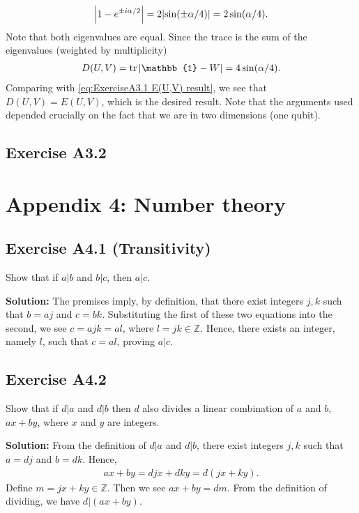 \documentclass{book}
\begin{document}
    \begin{align}
        \abs{1-e^{\pm i\alpha/2}} = 2\abs{\sin(\pm \alpha/4)} = 2 \sin (\alpha/4).
    \end{align}
    Note that both eigenvalues are equal. Since the trace is the sum of the eigenvalues (weighted by multiplicity)
    \begin{align}
        D(U,V) = \tr \abs{\mathbb{1}-W} = 4\sin(\alpha/4).
    \end{align}
    Comparing with \eqref{eq:ExerciseA3.1 E(U,V) result}, we see that $D(U,V) = E(U,V)$, which is the desired result. Note that the arguments used depended crucially on the fact that we are in two dimensions (one qubit).
    
\section*{Exercise A3.2}

\chapter*{Appendix 4: Number theory}


\section*{Exercise A4.1 (Transitivity)}
    Show that if $a|b$ and $b|c$, then $a|c$.
    
    \textbf{Solution:} The premises imply, by definition, that there exist integers $j, k$ such that $b = a j$ and $c = b k$. Substituting the first of these two equations into the second, we see $c = a j k = a l$, where $l = j k \in \mathbb{Z}$. Hence, there exists an integer, namely $l$, such that $c = a l$, proving $a |c$.

\section*{Exercise A4.2}
    Show that if $d|a$ and $d|b$ then $d$ also divides a linear combination of $a$ and $b$, $ax+by$, where $x$ and $y$ are integers.
    
    \textbf{Solution:} From the definition of $d|a$ and $d|b$, there exist integers $j, k $ such that $a = d j$ and $b= dk$. Hence,
    \begin{align}
        ax + by = djx + dky = d(jx + ky).
    \end{align}
    Define $m = jx +ky \in \mathbb{Z}$. Then we see $ax + by = dm$. From the definition of dividing, we have $d|(ax+by)$. 
\end{document}
